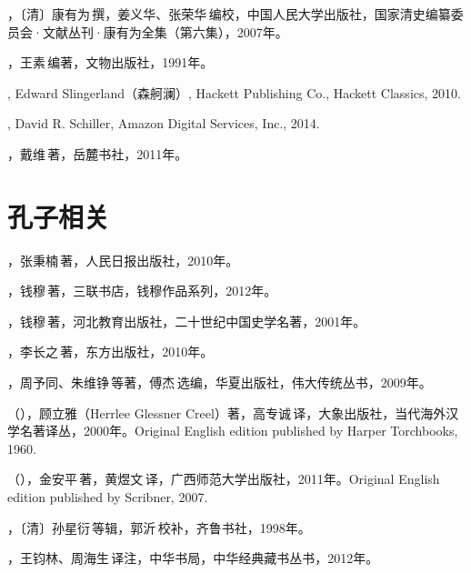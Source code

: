 ，〔清〕康有为\,撰，姜义华、张荣华\,编校，中国人民大学出版社，国家清史编纂委员会·文献丛刊·康有为全集（第六集），2007年。

，王素\,编著，文物出版社，1991年。

, Edward Slingerland（森舸澜）, Hackett Publishing Co., Hackett Classics, 2010.

, David R. Schiller, Amazon Digital Services, Inc., 2014.

，戴维\,著，岳麓书社，2011年。


\lypdfbookmark\section*{孔子相关}

，张秉楠\,著，人民日报出版社，2010年。

，钱穆\,著，三联书店，钱穆作品系列，2012年。

，钱穆\,著，河北教育出版社，二十世纪中国史学名著，2001年。

，李长之\,著，东方出版社，2010年。

，周予同、朱维铮\,等著，傅杰\,选编，华夏出版社，伟大传统丛书，2009年。

（），顾立雅（Herrlee Glessner Creel）著，高专诚\,译，大象出版社，当代海外汉学名著译丛，2000年。Original English edition published by Harper Torchbooks, 1960.

（），金安平\,著，黄煜文\,译，广西师范大学出版社，2011年。Original English edition published by Scribner, 2007.

，〔清〕孙星衍\,等辑，郭沂\,校补，齐鲁书社，1998年。

，王钧林、周海生\,译注，中华书局，中华经典藏书丛书，2012年。


